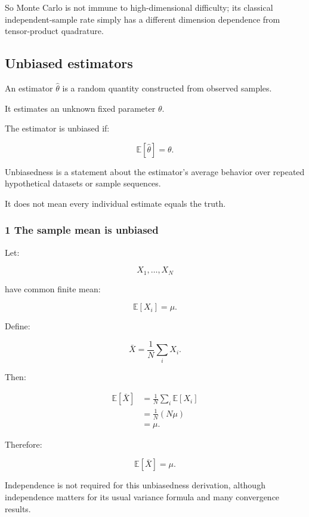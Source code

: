 So Monte Carlo is not immune to high-dimensional difficulty; its classical independent-sample rate simply has a different dimension dependence from tensor-product quadrature.

\subsection{Unbiased estimators}\label{02-foundations-ii-ch030-unbiased-estimators}

\hypertarget{02-foundations-ii-ch030-unbiased-estimators}{}

An estimator \(\widehat\theta\) is a random quantity constructed from observed samples.

It estimates an unknown fixed parameter \(\theta\).

The estimator is unbiased if:

\[
 \boxed{ \mathbb E[\widehat\theta]=\theta }.
\]

Unbiasedness is a statement about the estimator's average behavior over repeated hypothetical datasets or sample sequences.

It does not mean every individual estimate equals the truth.

\subsubsection{1 The sample mean is unbiased}\label{02-foundations-ii-ch030-the-sample-mean-is-unbiased}

\hypertarget{02-foundations-ii-ch030-the-sample-mean-is-unbiased}{}

Let:

\[
 X_1,\ldots,X_N
\]

have common finite mean:

\[
 \mathbb E[X_i]=\mu.
\]

Define:

\[
 \bar X=\frac1N\sum_iX_i.
\]

Then:

\[
 \begin{aligned} \mathbb E[\bar X] &=\frac1N\sum_i\mathbb E[X_i]\\ &=\frac1N(N\mu)\\ &=\mu. \end{aligned}
\]

Therefore:

\[
 \boxed{\mathbb E[\bar X]=\mu}.
\]

Independence is not required for this unbiasedness derivation, although independence matters for its usual variance formula and many convergence results.

